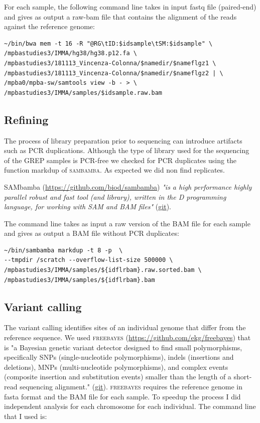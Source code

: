 For each sample, the following command line takes in input fastq file (paired-end) and gives as output a raw-bam file that contains the alignment of the reads against the reference genome: 

\begin{verbatim}
~/bin/bwa mem -t 16 -R "@RG\tID:$idsample\tSM:$idsample" \
/mpbastudies3/IMMA/hg38/hg38.p12.fa \ 
/mpbastudies3/181113_Vincenza-Colonna/$namedir/$nameflgz1 \ 
/mpbastudies3/181113_Vincenza-Colonna/$namedir/$nameflgz2 | \ 
/mpba0/mpba-sw/samtools view -b - > \
/mpbastudies3/IMMA/samples/$idsample.raw.bam
\end{verbatim}


\subsection{Refining}
The  process of library preparation prior to sequencing can introduce artifacts such as PCR duplications. Although the type of library used for the sequencing of the GREP samples is PCR-free we checked for PCR duplicates using the function markdup of \textsc{sambamba}. As expected we did non find replicates. 

SAMbamba (\url{https://github.com/biod/sambamba}) \textit{"is a high performance highly parallel robust and fast tool (and library), written in the D programming language, for working with SAM and BAM files"}  (\href{https://github.com/biod/sambamba#introduction}{git}).

The command line takes as input a raw version of the BAM file for each sample and gives as output a BAM file without PCR duplicates:  

\begin{verbatim}
~/bin/sambamba markdup -t 8 -p  \
--tmpdir /scratch --overflow-list-size 500000 \
/mpbastudies3/IMMA/samples/${idflrbam}.raw.sorted.bam \
/mpbastudies3/IMMA/samples/${idflrbam}.bam    
\end{verbatim}


\subsection{Variant calling} 
The variant calling identifies sites of an individual genome that differ from the reference sequence. We used \textsc{freebayes} (\url{https://github.com/ekg/freebayes}) that is "a Bayesian genetic variant detector designed to find small polymorphisms, specifically SNPs (single-nucleotide polymorphisms), indels (insertions and deletions), MNPs (multi-nucleotide polymorphisms), and complex events (composite insertion and substitution events) smaller than the length of a short-read sequencing alignment." (\href{https://github.com/ekg/freebayes}{git}).
\textsc{freebayes} requires the reference genome in fasta format and the BAM file for each sample. To speedup the process I did independent analysis for each chromosome for each individual. The command line that I used is: 

